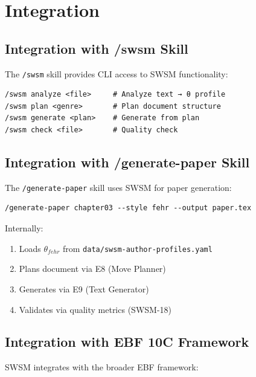 
\section{Integration}
\label{sec:sw-integration}

\subsection{Integration with /swsm Skill}

The \texttt{/swsm} skill provides CLI access to SWSM functionality:

\begin{verbatim}
/swsm analyze <file>     # Analyze text → θ profile
/swsm plan <genre>       # Plan document structure
/swsm generate <plan>    # Generate from plan
/swsm check <file>       # Quality check
\end{verbatim}

\subsection{Integration with /generate-paper Skill}

The \texttt{/generate-paper} skill uses SWSM for paper generation:

\begin{verbatim}
/generate-paper chapter03 --style fehr --output paper.tex
\end{verbatim}

Internally:
\begin{enumerate}
    \item Loads $\theta_{fehr}$ from \texttt{data/swsm-author-profiles.yaml}
    \item Plans document via E8 (Move Planner)
    \item Generates via E9 (Text Generator)
    \item Validates via quality metrics (SWSM-18)
\end{enumerate}

\subsection{Integration with EBF 10C Framework}

SWSM integrates with the broader EBF framework:

